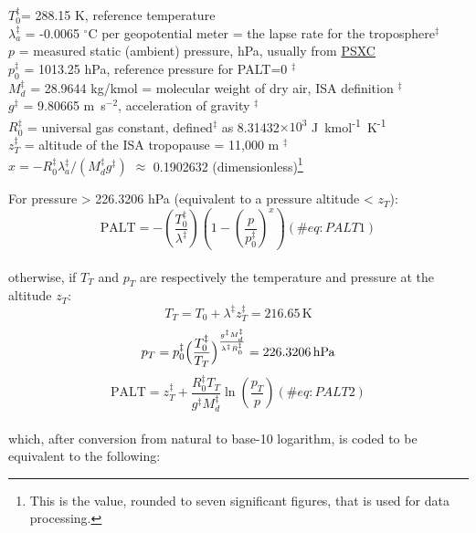 \documentclass[
  english,
]{book}
\begin{document}
\(T_{0}^{\ddagger}\)= 288.15 K, reference temperature\\
\(\lambda_{a}^{\ddagger}\)
=
-0.0065 \(^{\circ}\)C per geopotential meter = the lapse
rate for the
troposphere\(^{\ddagger}\)\\
\(p\) = measured static (ambient) pressure, hPa, usually from
\protect\hyperlink{psx}{PSXC}\\
\(p_{0}^{\ddagger}\) = 1013.25 hPa, reference pressure for PALT=0 \(^{\ddagger}\)\\
\(M_{d}^{\ddagger}\) = 28.9644 kg/kmol = molecular weight of dry air,
ISA definition \(^{\ddagger}\)\\
\(g^{\ddagger}\) = 9.80665 m~s\(^{-2}\), acceleration of gravity
\(^{\ddagger}\)\\
\(R_{0}^{\ddagger}\) = universal gas constant, defined\(^{\ddagger}\) as
8.31432\(\times10^{3}\)
J~kmol\textsuperscript{-1}~K\textsuperscript{-1}\\
\(z_{T}^{\ddagger}\) = altitude of the ISA tropopause = 11,000 m
\(^{\ddagger}\)\\
\(x=-R_{0}^{\ddagger}\lambda_{a}^{\ddagger}/(M_{d}^{\ddagger}g^{\ddagger})\)
\(\approx\) 0.1902632
(dimensionless)\footnote{This is the value, rounded to seven significant figures, that is used for data processing.}

For pressure \textgreater{} 226.3206 hPa (equivalent to a pressure
altitude \textless{} \(z_{T}\)): \begin{equation}
\mathrm{PALT}=-\left(\frac{T_{0}^{\ddagger}}{\lambda^{\ddagger}}\right)\left(1-\left(\frac{p}{p_{0}^{\ddagger}}\right)^{x}\right)
(\#eq:PALT1)
\end{equation}\\
otherwise, if
\(T_{T}\) and
\(p_{T}\) are
respectively the temperature and pressure at the
altitude
\(z_{T}\):\\
\[T_{T}=T_{0}+\lambda^{\ddagger}z_{T}^{\ddagger}=216.65\,\mathrm{K}\]
\[p_{T}=p_{0}^{\ddagger}\Bigl(\frac{T_{0}^{\ddagger}}{T_{T}}\Bigr)^{\frac{g^{\ddagger}M_{d}^{\ddagger}}{\lambda^{\ddagger}R_{0}^{\ddagger}}}=226.3206\,\mathrm{hPa}\]
\begin{equation}
\mathrm{PALT}=z_{T}^{\ddagger}+\frac{R_{0}^{\ddagger}T_{T}}{g^{\ddagger}M_{d}^{\ddagger}}\ln\left(\frac{p_{T}}{p}\right)
(\#eq:PALT2)
\end{equation}\\
which, after conversion from natural to base-10 logarithm, is coded to
be equivalent to the following:
\end{document}
